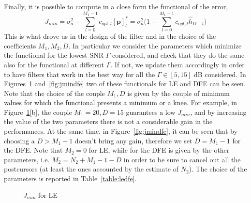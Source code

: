 \documentclass[10pt]{article}
\begin{document}
Finally, it is possible to compute in a close form the functional of the error, 
\begin{equation}
	J_{min} = \sigma_a^2 - \sum_{l=0}^{M_1-1} c_{opt, l}[\mathbf{p}]^*_l = \sigma_a^2\bigg( 1 - \sum_{l=0}^{M_1-1}c_{opt, l}\hat{h}_{D-l} \bigg)
\end{equation}
This is what drove us in the design of the filter and in the choice of the coefficients $M_1, M_2, D$. In particular we consider the parameters which minimize the functional for the lowest SNR $\Gamma$ considered, and check that they do the same also for the functional at different $\Gamma$. If not, we update them accordingly in order to have filters that work in the best way for all the $\Gamma \in [5, 15]$ dB considered. In Figures~\ref{fig:jminle} and~\ref{fig:jmindfe} two of these functionals for LE and DFE can be seen. Note that the choice of the couple $M_1, D$ is given by the couple of minimum values for which the functional presents a minimum or a knee. For example, in Figure~\ref{fig:jminle}[b], the couple $M_1 = 20, D = 15$ guarantees a low $J_{min}$, and by increasing the value of the two parameters there is not a considerable gain in the performances. At the same time, in Figure~\ref{fig:jmindfe}, it can be seen that by choosing a $D > M_1 - 1$ doesn't bring any gain, therefore we set $D = M_1 - 1$ for the DFE. Note that $M_2 = 0$ for LE, while for the DFE is given by the other parameters, i.e. $M_2 = N_2 + M_1 - 1 - D$ in order to be sure to cancel out all the postcursors (at least the ones accounted by the estimate of $N_2$). The choice of the parameters is reported in Table~\ref{table:ledfe}. 


\begin{figure}
	\centering
	\caption{$J_{min}$ for LE}
	\label{fig:jminle}
\end{figure}
\end{document}
